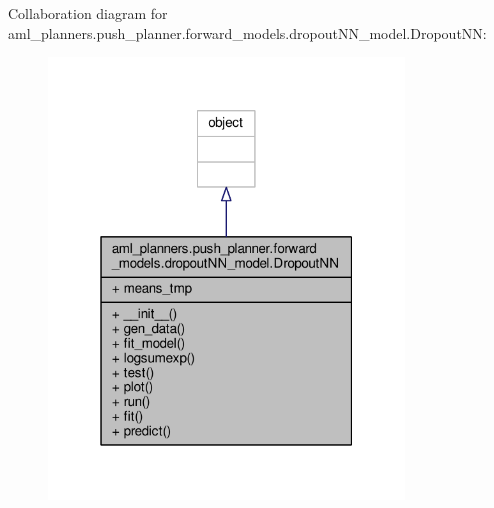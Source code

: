 Collaboration diagram for aml\-\_\-planners.\-push\-\_\-planner.\-forward\-\_\-models.\-dropout\-N\-N\-\_\-model.\-Dropout\-N\-N\-:\nopagebreak
\begin{figure}[H]
\begin{center}
\leavevmode
\includegraphics[width=268pt]{classaml__planners_1_1push__planner_1_1forward__models_1_1dropout_n_n__model_1_1_dropout_n_n__coll__graph}
\end{center}
\end{figure}
